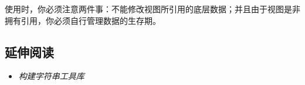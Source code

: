 
\begin{myNote}
使用时，你必须注意两件事：不能修改视图所引用的底层数据；并且由于视图是非拥有引用，你必须自行管理数据的生存期。
\end{myNote}



\subsection{延伸阅读}



\begin{itemize}
\item \textit{构建字符串工具库}

\end{itemize}
